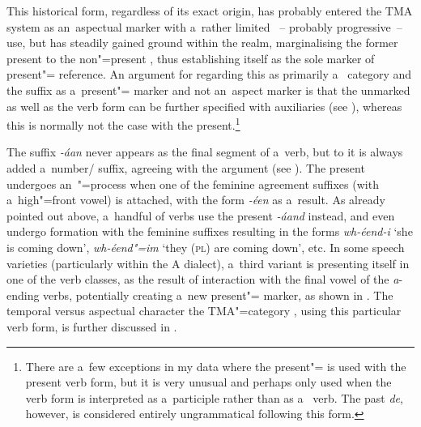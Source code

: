 This historical  form, regardless of its exact origin, has probably entered the TMA system as an~aspectual marker with a~rather limited ~-- probably progressive~-- use, but has steadily gained ground within the  realm, marginalising the former present  to the non"=present , thus establishing itself as the sole marker of present"= reference. An argument for regarding this as primarily a~ category and the suffix as a~present"= marker and not an~aspect marker is that the unmarked  as well as the  verb form can be further specified with  auxiliaries (see ), whereas this is normally not the case with the present.\footnote{There are a~few exceptions in my data where the present"=  is used with the present verb form, but it is very unusual and perhaps only used when the verb form is interpreted as a~participle rather than as a~ verb. The past  \textit{de}, however, is considered entirely ungrammatical following this form.} 


The suffix \textit{-áan} never appears as the final segment of a~verb, but to it is always added a~number/ suffix, agreeing with the  argument (see ). The present   undergoes an~"=process when one of the feminine agreement suffixes (with a~high"=front vowel) is attached, with the form \textit{-éen} as a~result. As already pointed out above, a~handful of verbs use the present   \textit{-áand} instead, and even undergo  formation with the feminine suffixes resulting in the forms \textit{wh-éend-i} `she is coming down', \textit{wh-éend"=im} `they (\textsc{pl}) are coming down', etc. In some speech varieties (particularly within the A dialect), a~third variant is presenting itself in one of the verb classes, as the result of interaction with the final vowel of the \textit{a}-ending verbs, potentially creating a~new  present"= marker, as shown in . The temporal versus aspectual character the TMA"=category , using this particular verb form, is further discussed in .


